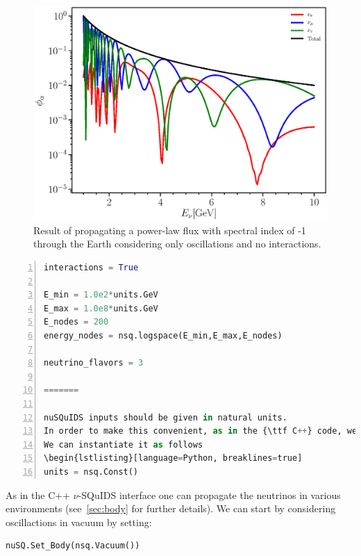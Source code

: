 \documentclass[3p,12pt]{elsarticle}
\newcommand{\ttf}{\ttfamily}
\begin{document}
\begin{figure}[h!]
  \label{fig:nusquids_atm_python_no_interaction}
  \centering
  \includegraphics[width=\textwidth]{fig/nusquids_atm_python_no_int.eps}
  \caption{Result of propagating a power-law flux with spectral index of -1 through the Earth considering only oscillations and no interactions.}
\end{figure}

\begin{lstlisting}[language=Python, frame=leftline, numbers=left, breaklines=true]
interactions = True

E_min = 1.0e2*units.GeV
E_max = 1.0e8*units.GeV
E_nodes = 200
energy_nodes = nsq.logspace(E_min,E_max,E_nodes)

neutrino_flavors = 3

=======

nuSQuIDS inputs should be given in natural units.
In order to make this convenient, as in the {\ttf C++} code, we make use of the {\ttf SQuIDS} class {\ttf Const}.
We can instantiate it as follows
\begin{lstlisting}[language=Python, breaklines=true]
units = nsq.Const()
\end{lstlisting}

As in the {\ttf C++} $\nu$-SQuIDS interface one can propagate the neutrinos in various environments
(see~\ref{sec:body} for further details). We can start by considering oscillactions in vacuum by setting:
\begin{lstlisting}[language=Python, breaklines=true]
nuSQ.Set_Body(nsq.Vacuum())
\end{lstlisting}
\end{document}
